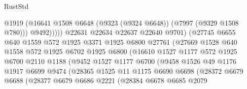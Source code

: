 \begin{lexlean}{RustStd}
\begin{coremodule}
                                    @1919
                                    (@16641
                                      @1508
                                      @6648
                                      (@9323 (@9324 @6648))
                                      (@7997 (@9329 @1508 @780)))
                                    @9492)))))
                          @22631
                          @22634
                          @22637
                          @22640
                          @9701)
                        (@27745
                          @6655
                          @640
                          @1559
                          @572
                          @1925
                          @3371
                          @1925
                          @6800
                          @27761
                          (@27669
                            @1528
                            @640
                            @1558
                            @572
                            @1925
                            @6702
                            @1925
                            @6800
                            (@16610
                              @1527
                              @1177
                              @572
                              @1925
                              @6700
                              @2110
                              @1188
                              (@9452
                                @1527
                                @1177
                                @6700
                                (@9458
                                  @1526
                                  @49
                                  @1176
                                  @1917
                                  @6699
                                  @9474
                                  (@28365
                                    @1525
                                    @11
                                    @1175
                                    @6690
                                    @6698
                                    (@28372
                                      @6679
                                      @6688
                                      (@28377
                                        @6679
                                        @6686
                                        @2221
                                        (@28384
                                          @6678
                                          @6685
                                          @2079

\end{coremodule}
\end{lexlean}
